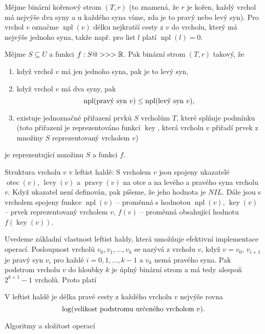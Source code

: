 \documentclass[a4paper,12pt]{article}
\def \emph#1{\underbar{#1}}
\DeclareMathOperator*{\otec}{otec}
\DeclareMathOperator*{\levy}{levy}
\DeclareMathOperator*{\pravy}{pravy}
\DeclareMathOperator*{\key}{key}
\DeclareMathOperator*{\npl}{npl}
\begin{document}
Mějme binární kořenový strom $(T,r)$ (to znamená, že $
r$ je kořen, 
každý vrchol má nejvýše dva syny a u každého syna 
víme, zda je to pravý nebo levý syn). Pro vrchol $v$ 
označme $\npl(v)$ délku nejkratší cesty z $v$ do vrcholu, který má 
nejvýše jednoho syna, takže např. pro list $l$ platí $\npl
(l)=0$. 

Mějme $S\subseteq U$ a funkci $f:S@>>>\Bbb R$. Pak binární strom 
$(T,r)$ takový, že
\begin{enumerate}
\item
když vrchol $v$ má jen jednoho syna, pak je to levý syn,
\item
když vrchol $v$ má dva syny, pak 
$$\npl(\text{\rm pravý syn }v)\le\npl(\text{\rm levý syn }v),$$
\item
existuje jednoznačné přiřazení prvků $S$  
vrcholům $T$, které splňuje podmínku  
(toto přiřazení 
je reprezentováno funkcí $\key$, která vrcholu $v$ přiřadí prvek 
z množi\-ny $S$ reprezentovaný vrcholem $v$)
\end{enumerate}
je \emph{leftist} \emph{halda} 
reprezentující množinu $S$ a funkci $f$. 

Struktura vrcholu $v$ v leftist haldě:\newline 
S vrcholem $v$ jsou 
spojeny ukazatelé $\otec(v)$, $\levy(v)$ a $\pravy(v)$ na otce a 
na levého a pravého syna vrcholu $v$.  
Když ukazatel není definován, pak píšeme, že jeho hodnota je 
$NIL$.  Dále jsou s vrcholem spojeny funkce\newline 
$\npl(v)$ -- proměnná s hodnotou $\npl(v)$,\newline 
$\key(v)$ -- prvek reprezentovaný vrcholem $v$,\newline 
$f(v)$ -- proměnná obsahující hodnotu $f(\key(v))$.

Uvedeme základní vlastnost leftist haldy, která 
umožňuje efektivní implementace operací. 
Posloupnost vrcholů $v_0,v_1,\dots,v_k$ se nazývá 
\emph{pravá} \emph{cesta} z vrcholu $v$, když $v=v_0$, $v_{i
+1}$ 
je pravý syn $v_i$ pro každé $i=0,1,\dots,k-1$ a $v_k$ nemá 
pravého syna. Pak podstrom vrcholu $v$ do hloubky $k$ je 
úplný binární strom a má tedy  
alespoň $2^{k+1}-1$ vrcholů. Proto platí 

\begin{tvrzeni}V leftist haldě je 
délka pravé cesty z každého vrcholu $v$ nejvýše rovna 
$$\log(\text{\rm velikost podstromu určeného vrcholem }v).$$
\end{tvrzeni}

\head
Algoritmy a složitost operací
\endhead
\end{document}
